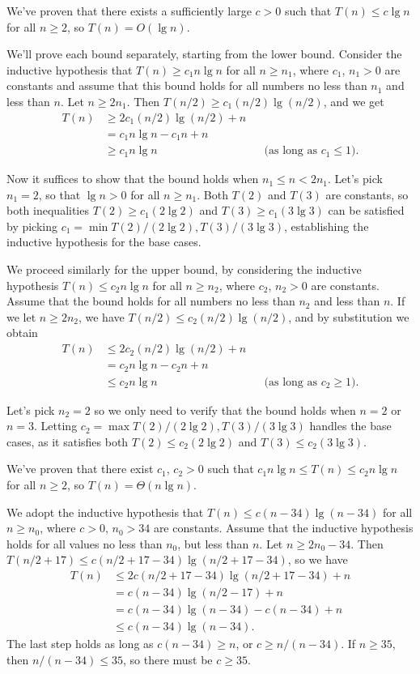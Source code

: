 We've proven that there exists a sufficiently large $c>0$ such that $T(n)\le c\lg n$ for all $n\ge2$, so $T(n)=O(\lg n)$.

\subexercise
We'll prove each bound separately, starting from the lower bound.
Consider the inductive hypothesis that $T(n)\ge c_1n\lg n$ for all $n\ge n_1$, where $c_1$, $n_1>0$ are constants and assume that this bound holds for all numbers no less than $n_1$ and less than $n$.
Let $n\ge2n_1$.
Then $T(n/2)\ge c_1(n/2)\lg(n/2)$, and we get
\begin{align*}
    T(n) &\ge 2c_1(n/2)\lg(n/2)+n \\
    &= c_1n\lg n-c_1n+n \\
    &\ge c_1n\lg n && \text{(as long as $c_1\le1$)}.
\end{align*}

Now it suffices to show that the bound holds when $n_1\le n<2n_1$.
Let's pick $n_1=2$, so that $\lg n>0$ for all $n\ge n_1$.
Both $T(2)$ and $T(3)$ are constants, so both inequalities $T(2)\ge c_1(2\lg2)$ and $T(3)\ge c_1(3\lg3)$ can be satisfied by picking $c_1=\min{T(2)/(2\lg2),T(3)/(3\lg3)}$, establishing the inductive hypothesis for the base cases.

We proceed similarly for the upper bound, by considering the inductive hypothesis $T(n)\le c_2n\lg n$ for all $n\ge n_2$, where $c_2$, $n_2>0$ are constants.
Assume that the bound holds for all numbers no less than $n_2$ and less than $n$.
If we let $n\ge2n_2$, we have $T(n/2)\le c_2(n/2)\lg(n/2)$, and by substitution we obtain
\begin{align*}
    T(n) &\le 2c_2(n/2)\lg(n/2)+n \\
    &= c_2n\lg n-c_2n+n \\
    &\le c_2n\lg n && \text{(as long as $c_2\ge1$)}.
\end{align*}

Let's pick $n_2=2$ so we only need to verify that the bound holds when $n=2$ or $n=3$.
Letting $c_2=\max{T(2)/(2\lg2),T(3)/(3\lg3)}$ handles the base cases, as it satisfies both $T(2)\le c_2(2\lg2)$ and $T(3)\le c_2(3\lg3)$.

We've proven that there exist $c_1$, $c_2>0$ such that $c_1n\lg n\le T(n)\le c_2n\lg n$ for all $n\ge2$, so $T(n)=\Theta(n\lg n)$.

\subexercise
We adopt the inductive hypothesis that $T(n)\le c(n-34)\lg(n-34)$ for all $n\ge n_0$, where $c>0$, $n_0>34$ are constants.
Assume that the inductive hypothesis holds for all values no less than $n_0$, but less than $n$.
Let $n\ge2n_0-34$.
Then $T(n/2+17)\le c(n/2+17-34)\lg(n/2+17-34)$, so we have
\begin{align*}
    T(n) &\le 2c(n/2+17-34)\lg(n/2+17-34)+n \\
    &= c(n-34)\lg(n/2-17)+n \\
    &= c(n-34)\lg(n-34)-c(n-34)+n \\
    &\le c(n-34)\lg(n-34).
\end{align*}
The last step holds as long as $c(n-34)\ge n$, or $c\ge n/(n-34)$.
If $n\ge35$, then $n/(n-34)\le35$, so there must be $c\ge35$.

